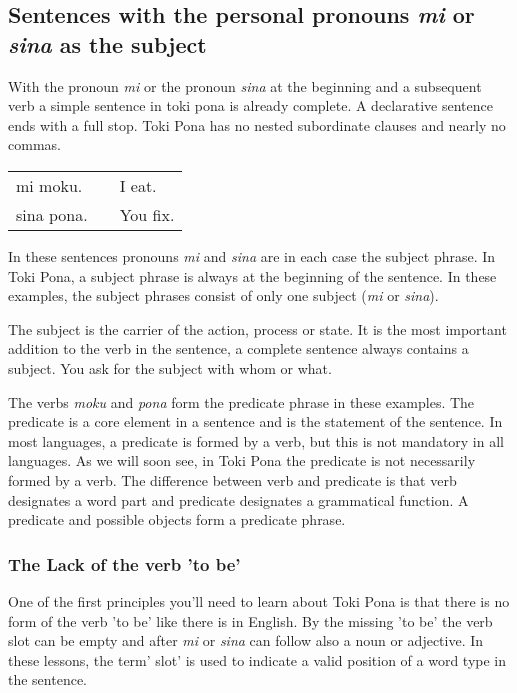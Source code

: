% 
\label{'predicate'}
\subsection*{Sentences with the personal pronouns \textit{mi} or \textit{sina} as the subject}
%
With the pronoun \textit{mi} or the pronoun \textit{sina} at the beginning and a subsequent verb a simple sentence in toki pona is already complete. 
A declarative sentence ends with a full stop. 
Toki Pona has no nested subordinate clauses and nearly no commas. 

\begin{supertabular}{p{5,5cm}|ll}
mi moku. && I eat. \\
sina pona. && You fix. \\
\end{supertabular} 

In these sentences pronouns \textit{mi} and \textit{sina} are in each case the subject phrase. 
In Toki Pona, a subject phrase is always at the beginning of the sentence. 
In these examples, the subject phrases consist of only one subject (\textit{mi} or \textit{sina}).

The subject is the carrier of the action, process or state. 
It is the most important addition to the verb in the sentence, a complete sentence always contains a subject. 
You ask for the subject with whom or what.

The verbs \textit{moku} and \textit{pona} form the predicate phrase in these examples.  
The predicate is a core element in a sentence and is the statement of the sentence.
In most languages, a predicate is formed by a verb, but this is not mandatory in all languages. 
As we will soon see, in Toki Pona the predicate is not necessarily formed by a verb. 
The difference between verb and predicate is that verb designates a word part and predicate designates a grammatical function.
A predicate and possible objects form a predicate phrase. 
%
\newpage{}
\subsubsection*{The Lack of the verb 'to be'}
%
One of the first principles you'll need to learn about Toki Pona is that there is no form of the verb 'to be' like there is in English. 
By the missing 'to be' the verb slot can be empty and after \textit{mi} or \textit{sina} can follow also a noun or adjective. 
In these lessons, the term' slot' is used to indicate a valid position of a word type in the sentence.


